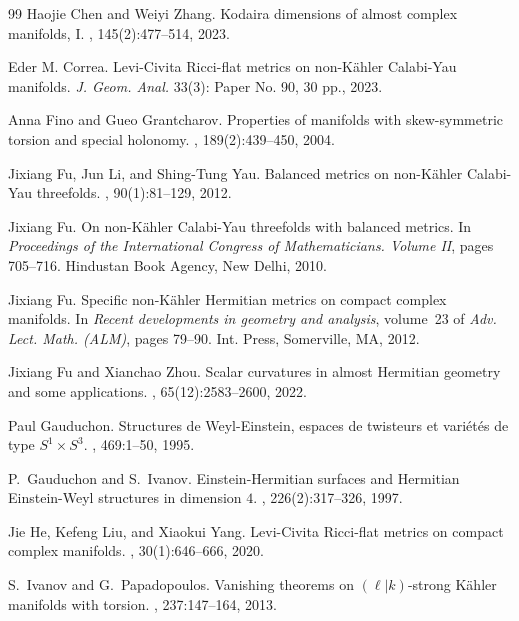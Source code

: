 \documentclass[12pt]{amsart}
\theoremstyle{plain}
\theoremstyle{definition}
\renewcommand{\>}{\rightarrow}
\numberwithin{equation}{section} %
\begin{document}
\begin{thebibliography}{99}
	Haojie Chen and Weiyi Zhang.
	\newblock Kodaira dimensions of almost complex manifolds, {I}.
	, 145(2):477--514, 2023.
	
Eder M.	Correa. 
	Levi-Civita Ricci-flat metrics on non-K\"ahler Calabi-Yau manifolds. \emph{J. Geom. Anal.} 33(3):  Paper No. 90, 30 pp.,  2023.
	
	
	Anna Fino and Gueo Grantcharov.
	\newblock Properties of manifolds with skew-symmetric torsion and special
	holonomy.
	, 189(2):439--450, 2004.
	
	Jixiang Fu, Jun Li, and Shing-Tung Yau.
	\newblock Balanced metrics on non-{K}\"{a}hler {C}alabi-{Y}au threefolds.
	, 90(1):81--129, 2012.
	
	Jixiang Fu.
	\newblock On non-{K}\"{a}hler {C}alabi-{Y}au threefolds with balanced metrics.
	\newblock In {\em Proceedings of the {I}nternational {C}ongress of
		{M}athematicians. {V}olume {II}}, pages 705--716. Hindustan Book Agency, New
	Delhi, 2010.
	
	Jixiang Fu.
	\newblock Specific non-{K}\"{a}hler {H}ermitian metrics on compact complex
	manifolds.
	\newblock In {\em Recent developments in geometry and analysis}, volume~23 of
	{\em Adv. Lect. Math. (ALM)}, pages 79--90. Int. Press, Somerville, MA, 2012.
	
	Jixiang Fu and Xianchao Zhou.
	\newblock Scalar curvatures in almost {H}ermitian geometry and some
	applications.
	, 65(12):2583--2600, 2022.
	
	Paul Gauduchon.
	\newblock Structures de {W}eyl-{E}instein, espaces de twisteurs et
	vari\'{e}t\'{e}s de type {$S^1\times S^3$}.
	, 469:1--50, 1995.
	
	P.~Gauduchon and S.~Ivanov.
	\newblock Einstein-{H}ermitian surfaces and {H}ermitian {E}instein-{W}eyl
	structures in dimension {$4$}.
	, 226(2):317--326, 1997.
	
	Jie He, Kefeng Liu, and Xiaokui Yang.
	\newblock Levi-{C}ivita {R}icci-flat metrics on compact complex manifolds.
	, 30(1):646--666, 2020.
	
	
	S.~Ivanov and G.~Papadopoulos.
	\newblock Vanishing theorems on {$(\ell|k)$}-strong {K}\"{a}hler manifolds with
	torsion.
	, 237:147--164, 2013.
	

\end{thebibliography}
\end{document}
